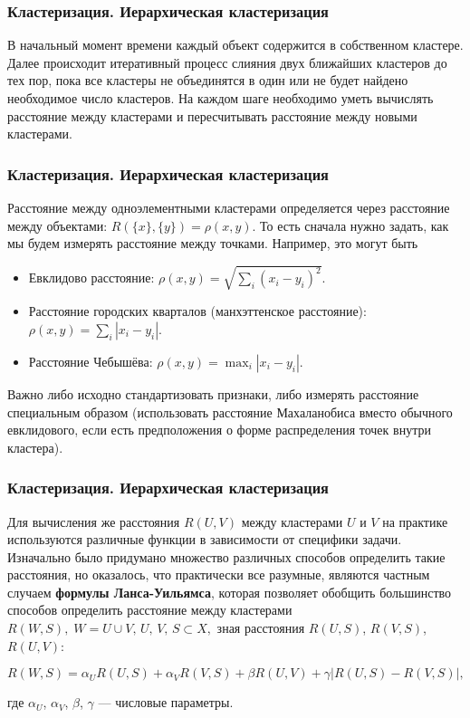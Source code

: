 \documentclass[ucs, notheorems, handout]{beamer}
\begin{document}
	\begin{frame}
	\frametitle{Кластеризация. Иерархическая кластеризация}
	
		В начальный момент времени каждый объект содержится в собственном кластере. Далее происходит итеративный процесс слияния двух ближайших кластеров до тех пор, пока все кластеры не объединятся в один или не будет найдено необходимое число кластеров. На каждом шаге необходимо уметь вычислять расстояние между кластерами и пересчитывать расстояние между новыми кластерами. 

	\end{frame}
	
	\begin{frame}
	\frametitle{Кластеризация. Иерархическая кластеризация}
	
	Расстояние между одноэлементными кластерами определяется через расстояние между объектами: $R(\{x\}, \{y\})= \rho(x,y)$. То есть сначала нужно задать, как мы будем измерять расстояние между точками. Например, это могут быть
\begin{itemize}
	\item Евклидово расстояние: $\rho(x,y) = \sqrt{\sum_i (x_i - y_i)^2}$.
	\item Расстояние городских кварталов (манхэттенское расстояние):  $\rho(x,y) = \sum_i |x_i - y_i|$.
	\item Расстояние Чебышёва: $\rho(x,y) = \max_i |x_i - y_i|$.
\end{itemize}
Важно либо исходно стандартизовать признаки, либо измерять расстояние
специальным образом (использовать расстояние Махаланобиса вместо обычного евклидового, если есть предположения о форме распределения точек внутри кластера).
	\end{frame}
	
	\begin{frame}
	\frametitle{Кластеризация. Иерархическая кластеризация}
	
	Для вычисления же расстояния $R(U, V)$ между кластерами $U$ и $V$ на практике используются различные функции в зависимости от специфики задачи.
Изначально было придумано множество различных способов определить такие расстояния, но оказалось, что практически все разумные, являются частным случаем \textbf{формулы Ланса-Уильямса}, которая позволяет обобщить большинство способов определить расстояние между кластерами $ R(W, S),\; W = U \cup V,\, U,\, V,\, S \subset X, $ зная расстояния $R(U, S)$, $R(V, S)$, $R(U, V)$: 
	
	$$ R(W, S) = \alpha_{U} R(U, S) + \alpha_{V} R(V, S) + \beta R(U, V) + \gamma|R(U, S) - R(V, S)|,$$
	
	где $\alpha_{U}$, $\alpha_{V}$, $\beta$, $\gamma$ --- числовые параметры.
	\end{frame}
	
\end{document}
